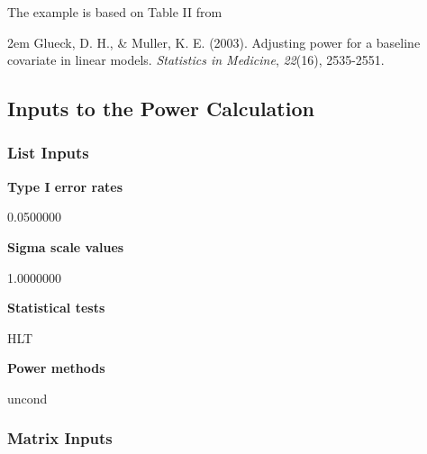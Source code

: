 \documentclass{glimmpse-report}
\begin{document}
The example is based on Table II from

\hangindent2em
 Glueck, D. H., \& Muller, K. E. (2003). Adjusting power for a baseline covariate in linear models. \emph{Statistics in Medicine}, \emph{22}(16), 2535-2551.


\subsection{Inputs to the Power Calculation}
\subsubsection{List Inputs}

{\bf Type I error rates}

0.0500000

{\bf Sigma scale values}

1.0000000

{\bf Statistical tests}

HLT

{\bf Power methods}

uncond

\subsubsection{Matrix Inputs}
\end{document}
